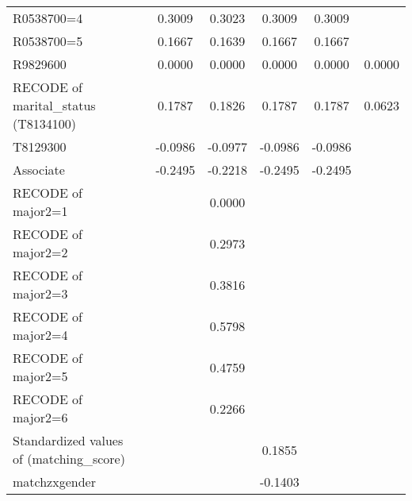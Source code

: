 \begin{table}[htbp]
\begin{tabular}{l*{6}{c}}
R0538700=4          &                     &      0.3009\sym{**} &      0.3023\sym{**} &      0.3009\sym{**} &      0.3009\sym{**} &                     \\
R0538700=5          &                     &      0.1667         &      0.1639         &      0.1667         &      0.1667         &                     \\
R9829600            &                     &      0.0000         &      0.0000         &      0.0000         &      0.0000         &      0.0000\sym{**} \\
RECODE of marital\_status (T8134100)&                     &      0.1787\sym{***}&      0.1826\sym{***}&      0.1787\sym{***}&      0.1787\sym{***}&      0.0623         \\
T8129300            &                     &     -0.0986\sym{***}&     -0.0977\sym{***}&     -0.0986\sym{***}&     -0.0986\sym{***}&                     \\
Associate           &                     &     -0.2495\sym{**} &     -0.2218\sym{*}  &     -0.2495\sym{**} &     -0.2495\sym{**} &                     \\
RECODE of major2=1  &                     &                     &      0.0000         &                     &                     &                     \\
RECODE of major2=2  &                     &                     &      0.2973\sym{*}  &                     &                     &                     \\
RECODE of major2=3  &                     &                     &      0.3816\sym{*}  &                     &                     &                     \\
RECODE of major2=4  &                     &                     &      0.5798\sym{***}&                     &                     &                     \\
RECODE of major2=5  &                     &                     &      0.4759\sym{**} &                     &                     &                     \\
RECODE of major2=6  &                     &                     &      0.2266         &                     &                     &                     \\
Standardized values of (matching\_score)     &                     &                     &                     &      0.1855\sym{***}&                     &                     \\
matchzxgender       &                     &                     &                     &     -0.1403\sym{**} &                     &                     \\

\end{tabular}
\end{table}
